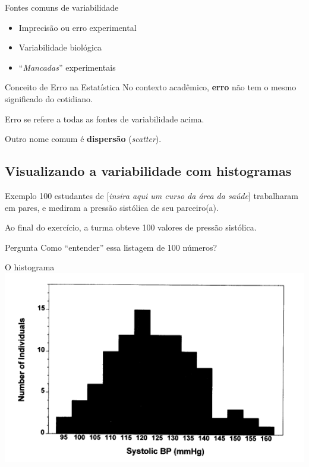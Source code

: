 \documentclass{beamer}
\begin{document}
\begin{frame}{\scriptsize Fontes comuns de variabilidade}
  \begin{itemize}
    \footnotesize
  \item Imprecisão ou erro experimental
  \item Variabilidade biológica
  \item ``{\em Mancadas}'' experimentais
  \end{itemize}
  \begin{block}{Conceito de Erro na Estatística}
    \footnotesize
    No contexto acadêmico, {\bf erro} não tem o mesmo significado do cotidiano.

    \bigskip
    Erro se refere a todas as fontes de variabilidade acima.

    \bigskip
    Outro nome comum é {\bf dispersão} ({\em scatter}).
  \end{block}
\end{frame}

\subsection{Visualizando a variabilidade com histogramas}

\begin{frame}
  \begin{exampleblock}{Exemplo}
    \footnotesize
    100 estudantes de [{\em insira aqui um curso da área da saúde}] trabalharam em pares, e mediram a pressão sistólica de seu parceiro(a).

    Ao final do exercício, a turma obteve 100 valores de pressão sistólica.
  \end{exampleblock}
  \begin{block}{Pergunta}
    \footnotesize
    Como ``entender'' essa listagem de 100 números?
  \end{block}
\end{frame}

\begin{frame}{\scriptsize O histograma}
  \includegraphics[height=\textheight]{Cap3/histograma1}
\end{frame}
\end{document}

